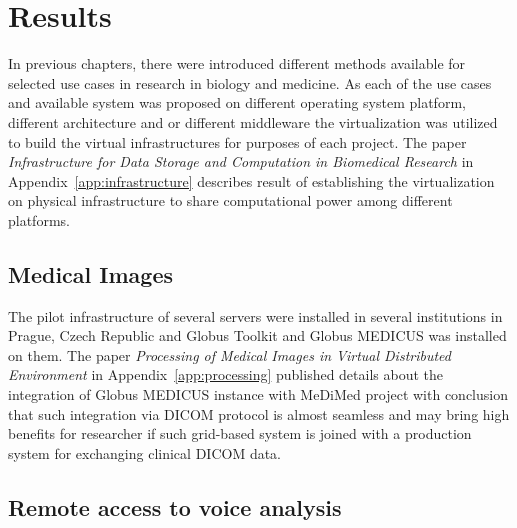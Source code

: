 \chapter{Results}
\label{sec:results}
In previous chapters, there were introduced different methods available for selected use cases in research in biology and medicine. 
As each of the use cases and available system was proposed on different operating system platform, different architecture and or different middleware the virtualization was utilized to build the virtual infrastructures for purposes of each project. The paper \cite{kulhanek2010c} \emph{Infrastructure for Data Storage and Computation in Biomedical Research} in Appendix~\ref{app:infrastructure} describes result of establishing the virtualization on physical infrastructure to share computational power among different platforms.

\section{Medical Images}
\label{sec:resultsimages}


The pilot infrastructure of several servers were installed in several institutions in Prague, Czech Republic and Globus Toolkit and Globus MEDICUS was installed on them. The paper \cite{kulhanek2009}  \emph{Processing of Medical Images in Virtual Distributed Environment} in Appendix~\ref{app:processing} published details about the integration of Globus MEDICUS instance with MeDiMed project with conclusion that such integration via DICOM protocol is almost seamless and may bring high benefits for researcher if such grid-based system is joined with a production system for exchanging clinical DICOM data. 

\section{Remote access to voice analysis}
\label{sec:resultsvoice}

